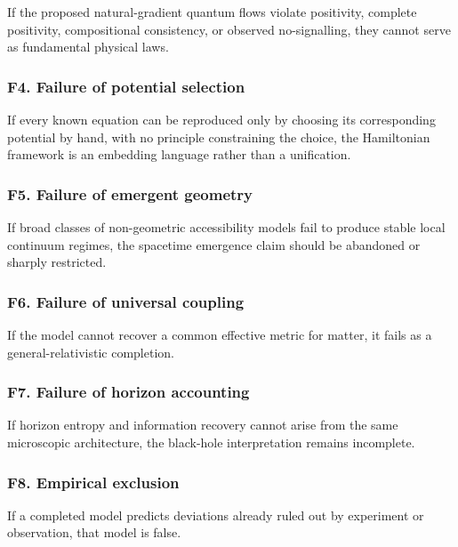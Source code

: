 \documentclass[
  11pt,
]{article}
\begin{document}
If the proposed natural-gradient quantum flows violate positivity,
complete positivity, compositional consistency, or observed
no-signalling, they cannot serve as fundamental physical laws.

\subsubsection{F4. Failure of potential
selection}\label{f4.-failure-of-potential-selection}

If every known equation can be reproduced only by choosing its
corresponding potential by hand, with no principle constraining the
choice, the Hamiltonian framework is an embedding language rather than a
unification.

\subsubsection{F5. Failure of emergent
geometry}\label{f5.-failure-of-emergent-geometry}

If broad classes of non-geometric accessibility models fail to produce
stable local continuum regimes, the spacetime emergence claim should be
abandoned or sharply restricted.

\subsubsection{F6. Failure of universal
coupling}\label{f6.-failure-of-universal-coupling}

If the model cannot recover a common effective metric for matter, it
fails as a general-relativistic completion.

\subsubsection{F7. Failure of horizon
accounting}\label{f7.-failure-of-horizon-accounting}

If horizon entropy and information recovery cannot arise from the same
microscopic architecture, the black-hole interpretation remains
incomplete.

\subsubsection{F8. Empirical exclusion}\label{f8.-empirical-exclusion}

If a completed model predicts deviations already ruled out by experiment
or observation, that model is false.
\end{document}
